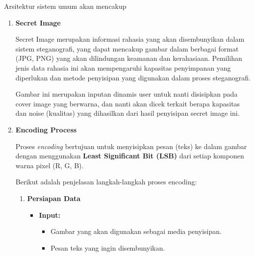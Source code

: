 \documentclass{ittelkom}
\begin{document}


Arsitektur sistem umum akan mencakup

\begin{enumerate}
    \item \textbf{Secret Image}

          Secret Image merupakan informasi rahasia yang akan disembunyikan dalam sistem
          steganografi, yang dapat mencakup gambar dalam berbagai format (JPG, PNG) yang
          akan dilindungan keamanan dan kerahasiaan. Pemilihan jenis data rahasia ini
          akan mempengaruhi kapasitas penyimpanan yang diperlukan dan metode penyisipan
          yang digunakan dalam proses steganografi.

          Gambar ini merupakan inputan dinamis user untuk nanti disisipkan pada cover
          image yang berwarna, dan nanti akan dicek terkait berapa kapasitas dan noise
          (kualitas) yang dihasilkan dari hasil penyisipan secret image ini.

    \item \textbf{Encoding Process}

          Proses \textit{encoding} bertujuan untuk menyisipkan pesan (teks) ke dalam
          gambar dengan menggunakan \textbf{Least Significant Bit (LSB)} dari setiap
          komponen warna pixel (R, G, B).

          Berikut adalah penjelasan langkah-langkah proses encoding:

          \begin{enumerate}
              \item \textbf{Persiapan Data}

                    \begin{itemize}
                        \item \textbf{Input:}
                              \begin{itemize}
                                  \item Gambar yang akan digunakan sebagai media penyisipan.
                                  \item Pesan teks yang ingin disembunyikan.
                              \end{itemize}


\end{itemize}
\end{enumerate}
\end{enumerate}
\end{document}

